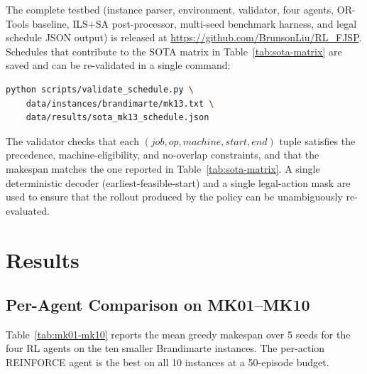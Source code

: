 \documentclass[10pt]{article}
\theoremstyle{definition}
\begin{document}
The complete testbed (instance parser, environment,
validator, four agents, OR-Tools baseline, ILS+SA
post-processor, multi-seed benchmark harness, and legal
schedule JSON output) is released at
\url{https://github.com/BrunsonLiu/RL_FJSP}. Schedules
that contribute to the SOTA matrix in
Table~\ref{tab:sota-matrix} are saved and can be
re-validated in a single command:
\begin{lstlisting}[language=bash, basicstyle=\ttfamily\footnotesize]
python scripts/validate_schedule.py \
    data/instances/brandimarte/mk13.txt \
    data/results/sota_mk13_schedule.json
\end{lstlisting}
The validator checks that each $(job, op, machine, start,
end)$ tuple satisfies the precedence, machine-eligibility,
and no-overlap constraints, and that the makespan
matches the one reported in Table~\ref{tab:sota-matrix}.
A single deterministic decoder (earliest-feasible-start)
and a single legal-action mask are used to ensure that
the rollout produced by the policy can be unambiguously
re-evaluated.

\section{Results}

\subsection{Per-Agent Comparison on MK01--MK10}

Table~\ref{tab:mk01-mk10} reports the mean greedy makespan over 5
seeds for the four RL agents on the ten smaller Brandimarte
instances. The per-action REINFORCE agent is the best on all
10 instances at a 50-episode budget.
\end{document}
